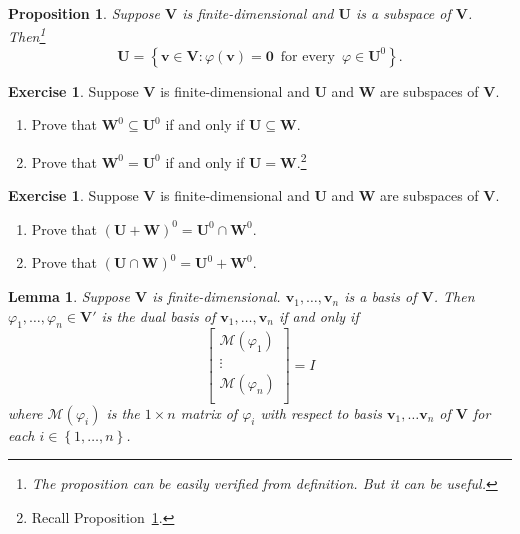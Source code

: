 \documentclass{tufte-handout}
\def \v {\vspace{0.2cm}}
\theoremstyle{plain} %
\newtheorem{prop}[thm]{Proposition}
\newtheorem{lem}[thm]{Lemma}
\theoremstyle{definition}
\newtheorem{exer}[thm]{Exercise}
\theoremstyle{remark}
\newcommand{\bra}[1]{\mathopen{}\left(#1\right)}
\newcommand{\cbra}[1]{\mathopen{}\left\{#1\right\}}
\renewcommand{\phi}{\varphi}
\newcommand{\mM}{\mathcal{M}}
\newcommand{\zero}{\mathbf{0}}
\newcommand{\U}{\bm{U}}
\newcommand{\V}{\bm{V}}
\newcommand{\W}{\bm{W}}
\renewcommand{\v}{\bm{v}}
\begin{document}
\begin{prop}\label{prop: relation between subspace and annihilator}
	Suppose $\V$ is finite-dimensional and $\U$ is a subspace of $\V$. Then\footnote{The proposition can be easily verified from definition. But it can be useful.}
	\[\U=\cbra{\v\in\V:\phi(\v)=\zero\,\text{ for every }\,\phi\in\U^0}.\]
\end{prop}

\begin{exer}
	Suppose $\V$ is finite-dimensional and $\U$ and $\W$ are subspaces of $\V$.
	\begin{enumerate}
		\item Prove that $\W^0\subseteq\U^0$ if and only if $\U\subseteq\W$.
		\item Prove that $\W^0=\U^0$ if and only if $\U=\W$.\footnote{Recall Proposition~\ref{prop: relation between subspace and annihilator}.}
	\end{enumerate}
\end{exer}

\begin{exer}
	Suppose $\V$ is finite-dimensional and $\U$ and $\W$ are subspaces of $\V$.\
	\begin{enumerate}
		\item Prove that $\bra{\U+\W}^0=\U^0\cap\W^0$.
		\item Prove that $\bra{\U\cap\W}^0=\U^0+\W^0$.
	\end{enumerate}
\end{exer}

\begin{lem}\label{lem: matrix of dual basis}
	Suppose $\V$ is finite-dimensional. $\v_1,\dots,\v_n$ is a basis of $\V$. Then $\phi_1,\dots,\phi_n\in\V'$ is the dual basis of $\v_1,\dots,\v_n$ if and only if
	\[\begin{bmatrix}
		\mM\bra{\phi_1}\\
		\vdots\\
		\mM\bra{\phi_n}\\
	\end{bmatrix}=I\]
	where $\mM\bra{\phi_i}$ is the $1\times n$ matrix of $\phi_i$ with respect to basis $\v_1,\dots\v_n$ of $\V$ for each $i\in\cbra{1,\dots,n}$.
\end{lem}
\end{document}
